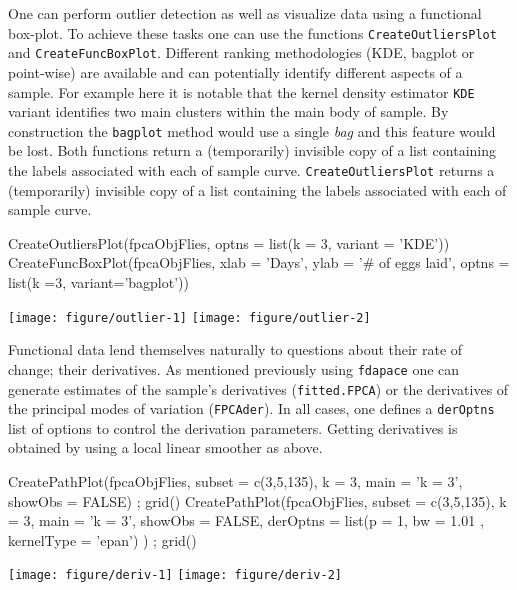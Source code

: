 \documentclass[11pt,english]{article}\usepackage[]{graphicx}\usepackage[]{color}
\begin{document}
One can perform outlier detection \cite{Febrero2007} as well as visualize data using a functional box-plot. To achieve these tasks one can use the functions \texttt{CreateOutliersPlot} and \texttt{CreateFuncBoxPlot}. Different ranking methodologies (KDE, bagplot \cite{Rousseeuw1999,Hyndman2010} or point-wise) are available and can potentially identify different aspects of a sample. For example here it is notable that the  kernel density estimator \texttt{KDE} variant identifies two main clusters within the main body of sample. By construction the \texttt{bagplot} method would use a single \textit{bag} and this feature would be lost. Both functions return a (temporarily) invisible copy of a list containing the labels associated with each of sample curve. \texttt{CreateOutliersPlot} returns a (temporarily) invisible copy of a list containing the labels associated with each of sample curve.
\begin{Schunk}
\begin{Sinput}
  CreateOutliersPlot(fpcaObjFlies, optns = list(k = 3, variant = 'KDE'))
  CreateFuncBoxPlot(fpcaObjFlies, xlab = 'Days', ylab = '# of eggs laid', optns = list(k =3, variant='bagplot'))
\end{Sinput}


{\centering \texttt{[image: figure/outlier-1]} \texttt{[image: figure/outlier-2]} 

}

\end{Schunk}

Functional data lend themselves naturally to questions about their rate of change; their derivatives. As mentioned previously using \texttt{fdapace} one can generate estimates of the sample's derivatives (\texttt{fitted.FPCA}) or the derivatives of the principal modes of variation (\texttt{FPCAder}). In all cases, one defines a \texttt{derOptns} list of options to control the derivation parameters. Getting derivatives is obtained by using a local linear smoother as above. 

\begin{Schunk}
\begin{Sinput}
  CreatePathPlot(fpcaObjFlies, subset = c(3,5,135), k = 3, main = 'k = 3', showObs = FALSE) ; grid() 
  CreatePathPlot(fpcaObjFlies, subset = c(3,5,135), k = 3, main = 'k = 3', showObs = FALSE, derOptns = list(p = 1, bw = 1.01 , kernelType = 'epan') ) ; grid() 
\end{Sinput}


{\centering \texttt{[image: figure/deriv-1]} \texttt{[image: figure/deriv-2]} 

}

\end{Schunk}
\end{document}
